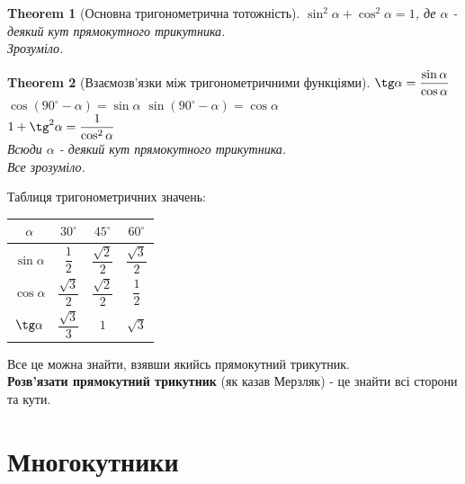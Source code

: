 \documentclass[a4paper, 10pt]{article}
\theoremstyle{theoremdd}
\newtheorem{theorem}{Theorem}[subsection]
\theoremstyle{theoremdd}
\theoremstyle{theoremdd}
\theoremstyle{theoremdd}
\theoremstyle{theoremdd}
\theoremstyle{theoremdd}
\theoremstyle{theoremdd}
\theoremstyle{theoremdd}
\theoremstyle{theoremdd}
\begin{document}
\begin{theorem}[Основна тригонометрична тотожність]
$\sin^2 \alpha + \cos^2 \alpha = 1$, де $\alpha$ - деякий кут прямокутного трикутника.\\
\textit{Зрозуміло.}
\end{theorem}

\begin{theorem}[Взаємозв'язки між тригонометричними функціями]
$\tg \alpha = \dfrac{\sin \alpha}{\cos \alpha}$\\
$\cos (90^\circ - \alpha) = \sin \alpha$ \hspace{1cm} $\sin (90^\circ - \alpha) = \cos \alpha$\\
$1 + \tg^2 \alpha = \dfrac{1}{\cos^2 \alpha}$\\
Всюди $\alpha$ - деякий кут прямокутного трикутника.\\
\textit{Все зрозуміло.}
\end{theorem}

Таблиця тригонометричних значень:\\
\begin{tabular}{c|c|c|c}
$\alpha$ & $30^\circ$ & $45^{\circ}$ & $60^\circ$ \\ \hline
$\sin \alpha$ & $\dfrac{1}{2}$ & $\dfrac{\sqrt{2}}{2}$ & $\dfrac{\sqrt{3}}{2}$ \\
$\cos \alpha$ & $\dfrac{\sqrt{3}}{2}$ & $\dfrac{\sqrt{2}}{2}$ & $\dfrac{1}{2}$ \\
$\tg \alpha$ & $\dfrac{\sqrt{3}}{3}$ & $1$ & $\sqrt{3}$ \\
\end{tabular}
Все це можна знайти, взявши якийсь прямокутний трикутник.
\bigskip \\
\textbf{Розв'язати прямокутний трикутник} (як казав Мерзляк) - це знайти всі сторони та кути.

\newpage

\section{Многокутники}
\end{document}
